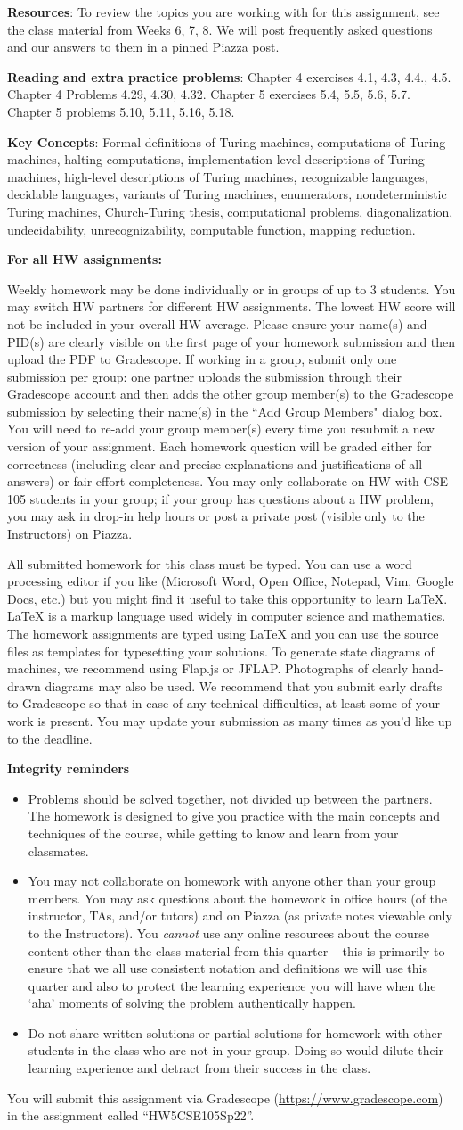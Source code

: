 \documentclass[12pt, oneside]{article}
\newcommand{\instructions}{{\bf For all HW assignments:}

Weekly homework may be done individually or in groups of up to 3 students. 
You may switch HW partners for different HW assignments. 
The lowest HW score will not be included in your overall HW average. 
Please ensure your name(s) and PID(s) are clearly visible on the first page of your homework submission 
and then upload the PDF to Gradescope. If working in a group, submit only one submission per group: 
one partner uploads the submission through their Gradescope account and then adds the other group member(s) 
to the Gradescope submission by selecting their name(s) in the ``Add Group Members" dialog box. 
You will need to re-add your group member(s) every time you resubmit a new version of your assignment.
 Each homework question will be graded either for correctness (including clear and precise explanations and 
 justifications of all answers) or fair effort completeness. You may only collaborate on HW with CSE 105 students 
 in your group; if your group has questions about a HW problem, you may ask in drop-in help hours or post a private 
 post (visible only to the Instructors) on Piazza.

All submitted homework for this class must be typed. 
You can use a word processing editor if you like (Microsoft Word, Open Office, Notepad, Vim, Google Docs, etc.) 
but you might find it useful to take this opportunity to learn LaTeX. 
LaTeX is a markup language used widely in computer science and mathematics. 
The homework assignments are typed using LaTeX and you can use the source files 
as templates for typesetting your solutions.
To generate state diagrams of machines, we recommend using Flap.js
or JFLAP. Photographs of clearly hand-drawn diagrams may also be used. We recommend that you
submit early drafts to Gradescope so that in case of any technical difficulties, at least some of your
work is present. You may update your submission as many times as you'd like up to the deadline.


{\bf Integrity reminders}
\begin{itemize}
\item Problems should be solved together, not divided up between the partners. The homework is
designed to give you practice with the main concepts and techniques of the course, 
while getting to know and learn from your classmates.
\item You may not collaborate on homework with anyone other than your group members.
You may ask questions about the homework in office hours (of the instructor, TAs, and/or tutors) and 
on Piazza (as private notes viewable only to the Instructors).  
You \emph{cannot} use any online resources about the course content other than the class material 
from this quarter -- this is primarily to ensure that we all use consistent notation and
definitions we will use this quarter and also to protect the learning experience you will have when
the `aha' moments of solving the problem authentically happen.
\item Do not share written solutions or partial solutions for homework with 
other students in the class who are not in your group. Doing so would dilute their learning 
experience and detract from their success in the class.
\end{itemize}

}
\begin{document}
{\bf Resources}: To review the topics you are working with 
for this assignment, see the class material from Weeks 6, 7, 8.
We will post frequently asked questions and our answers to them in a 
pinned Piazza post.

{\bf Reading and extra practice problems}: Chapter 4 exercises 4.1, 4.3, 4.4., 4.5. 
Chapter 4 Problems 4.29, 4.30, 4.32.  Chapter 5 exercises 5.4, 5.5, 
5.6, 5.7. Chapter 5 problems 5.10, 5.11, 5.16, 5.18.

{\bf Key Concepts}: Formal definitions of Turing machines, computations of Turing machines,
halting computations, implementation-level descriptions of Turing machines, high-level descriptions
of Turing machines, recognizable languages, decidable languages, variants of Turing machines,
enumerators, nondeterministic Turing machines, Church-Turing thesis,
 computational problems, diagonalization, undecidability, unrecognizability, 
computable function, mapping reduction.

\instructions

You will submit this assignment via Gradescope
(\href{https://www.gradescope.com}{https://www.gradescope.com}) 
in the assignment called ``HW5CSE105Sp22''.
\end{document}
